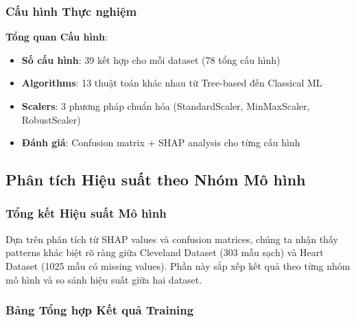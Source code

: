 \subsubsection{Cấu hình Thực nghiệm}

\textbf{Tổng quan Cấu hình}:
\begin{itemize}
    \item \textbf{Số cấu hình}: 39 kết hợp cho mỗi dataset (78 tổng cấu hình)
    \item \textbf{Algorithms}: 13 thuật toán khác nhau từ Tree-based đến Classical ML
    \item \textbf{Scalers}: 3 phương pháp chuẩn hóa (StandardScaler, MinMaxScaler, RobustScaler)
    \item \textbf{Đánh giá}: Confusion matrix + SHAP analysis cho từng cấu hình
\end{itemize}

\subsection{Phân tích Hiệu suất theo Nhóm Mô hình}\label{subsec:ra-performance-by-model-groups}

\subsubsection{Tổng kết Hiệu suất Mô hình}

Dựa trên phân tích từ SHAP values và confusion matrices, chúng ta nhận thấy patterns khác biệt rõ ràng giữa Cleveland Dataset (303 mẫu sạch) và Heart Dataset (1025 mẫu có missing values). Phần này sắp xếp kết quả theo từng nhóm mô hình và so sánh hiệu suất giữa hai dataset.

\subsubsection{Bảng Tổng hợp Kết quả Training}


